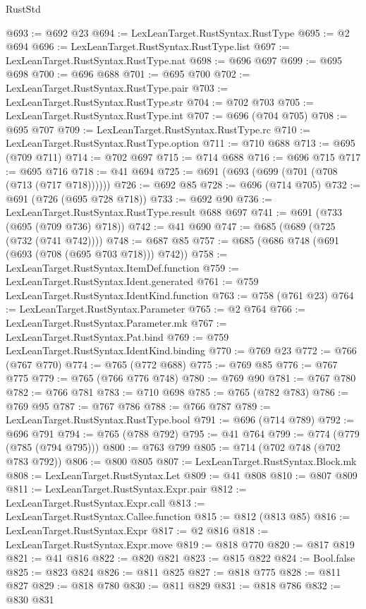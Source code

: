 \begin{lexlean}{RustStd}
\begin{coremodule}
@693 := @692 @23
@694 := LexLeanTarget.RustSyntax.RustType
@695 := @2 @694
@696 := LexLeanTarget.RustSyntax.RustType.list
@697 := LexLeanTarget.RustSyntax.RustType.nat
@698 := @696 @697
@699 := @695 @698
@700 := @696 @688
@701 := @695 @700
@702 := LexLeanTarget.RustSyntax.RustType.pair
@703 := LexLeanTarget.RustSyntax.RustType.str
@704 := @702 @703
@705 := LexLeanTarget.RustSyntax.RustType.int
@707 := @696 (@704 @705)
@708 := @695 @707
@709 := LexLeanTarget.RustSyntax.RustType.rc
@710 := LexLeanTarget.RustSyntax.RustType.option
@711 := @710 @688
@713 := @695 (@709 @711)
@714 := @702 @697
@715 := @714 @688
@716 := @696 @715
@717 := @695 @716
@718 := @41 @694
@725 := @691 (@693 (@699 (@701 (@708 (@713 (@717 @718))))))
@726 := @692 @85
@728 := @696 (@714 @705)
@732 := @691 (@726 (@695 @728 @718))
@733 := @692 @90
@736 := LexLeanTarget.RustSyntax.RustType.result @688 @697
@741 := @691 (@733 (@695 (@709 @736) @718))
@742 := @41 @690
@747 := @685 (@689 (@725 (@732 (@741 @742))))
@748 := @687 @85
@757 := @685 (@686 @748 (@691 (@693 (@708 (@695 @703 @718))) @742))
@758 := LexLeanTarget.RustSyntax.ItemDef.function
@759 := LexLeanTarget.RustSyntax.Ident.generated
@761 := @759 LexLeanTarget.RustSyntax.IdentKind.function
@763 := @758 (@761 @23)
@764 := LexLeanTarget.RustSyntax.Parameter
@765 := @2 @764
@766 := LexLeanTarget.RustSyntax.Parameter.mk
@767 := LexLeanTarget.RustSyntax.Pat.bind
@769 := @759 LexLeanTarget.RustSyntax.IdentKind.binding
@770 := @769 @23
@772 := @766 (@767 @770)
@774 := @765 (@772 @688)
@775 := @769 @85
@776 := @767 @775
@779 := @765 (@766 @776 @748)
@780 := @769 @90
@781 := @767 @780
@782 := @766 @781
@783 := @710 @698
@785 := @765 (@782 @783)
@786 := @769 @95
@787 := @767 @786
@788 := @766 @787
@789 := LexLeanTarget.RustSyntax.RustType.bool
@791 := @696 (@714 @789)
@792 := @696 @791
@794 := @765 (@788 @792)
@795 := @41 @764
@799 := @774 (@779 (@785 (@794 @795)))
@800 := @763 @799
@805 := @714 (@702 @748 (@702 @783 @792))
@806 := @800 @805
@807 := LexLeanTarget.RustSyntax.Block.mk
@808 := LexLeanTarget.RustSyntax.Let
@809 := @41 @808
@810 := @807 @809
@811 := LexLeanTarget.RustSyntax.Expr.pair
@812 := LexLeanTarget.RustSyntax.Expr.call
@813 := LexLeanTarget.RustSyntax.Callee.function
@815 := @812 (@813 @85)
@816 := LexLeanTarget.RustSyntax.Expr
@817 := @2 @816
@818 := LexLeanTarget.RustSyntax.Expr.move
@819 := @818 @770
@820 := @817 @819
@821 := @41 @816
@822 := @820 @821
@823 := @815 @822
@824 := Bool.false
@825 := @823 @824
@826 := @811 @825
@827 := @818 @775
@828 := @811 @827
@829 := @818 @780
@830 := @811 @829
@831 := @818 @786
@832 := @830 @831

\end{coremodule}
\end{lexlean}
